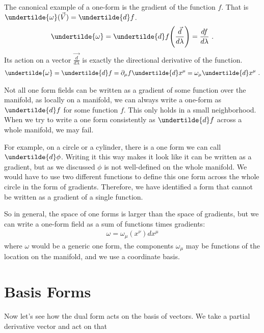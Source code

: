 \documentclass[11pt]{article}
\begin{document}
 \begin{example}
 The canonical example of a one-form is the gradient of the function $f$. That is  $\undertilde{\omega}(\vec{V}) = \undertilde{d}f $.
  \begin{align}
\undertilde{\omega}=\undertilde{d}f\Bigg(\frac{\vec{d}}{d\lambda}\Bigg) = \frac{df}{d\lambda}  \ .
\end{align} 
 Its action on a vector $\vec{\frac{d}{d\lambda}}$ is exactly the directional derivative of the function.
\begin{align}
\undertilde{\omega}=\undertilde{d}f = \partial_\mu f \undertilde{d} x^\mu = \omega_\mu \undertilde{d}x^\mu \ .
\end{align} 

 \end{example}
 
Not all one form fields can be written as a gradient of some function over the manifold, as
locally on a manifold, we can always write a one-form as $\undertilde{d}f$ for some function $f$. This only holds in a small neighborhood. When we try to write a one form consistently as $\undertilde{d}f$ across a whole manifold, we may fail.

For example, on a circle or a cylinder, there is a one form  we can call $\undertilde{d}\phi$. Writing it this way makes it look like it can be written as a gradient, but as we discussed $\phi$ is not well-defined on the whole manifold. We would have to use two different functions to define this one form across the whole circle in the form of gradients. Therefore, we have identified a form that cannot be written as a gradient of a single function.

So in general, the space of one forms is larger than the space of gradients, but we can write a one-form field as a sum of functions times gradients:
\begin{align}
\omega = \omega_\mu(x^\nu) d x^\mu
\end{align}
where $\omega$ would be a generic one form, the components $\omega_\mu$ may be functions of the location on the manifold, and we use a coordinate basis.







\section{Basis Forms}
Now let's see how the dual form acts on the basis of vectors. We take a partial derivative vector and act on that 
\end{document}
